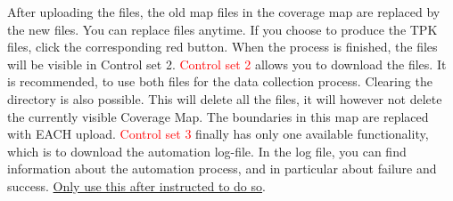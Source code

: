 \documentclass[a4paper]{article}
\begin{document}
After uploading the files, the old map files in the coverage map are replaced by the new files. You can replace files anytime. If you choose to produce the TPK files, click the corresponding red button. When the process is finished, the files will be visible in Control set 2.
\newline
\textcolor{red}{Control set 2} allows you to download the files. It is recommended, to use both files for the data collection process. Clearing the directory is also possible. This will delete all the files, it will however not delete the currently visible Coverage Map. The boundaries in this map are replaced with EACH upload.\newline
\textcolor{red}{Control set 3} finally has only one available functionality, which is to download the automation log-file. In the log file, you can find information about the automation process, and in particular about failure and success. \underline{Only use this after instructed to do so}. \newline
\end{document}
